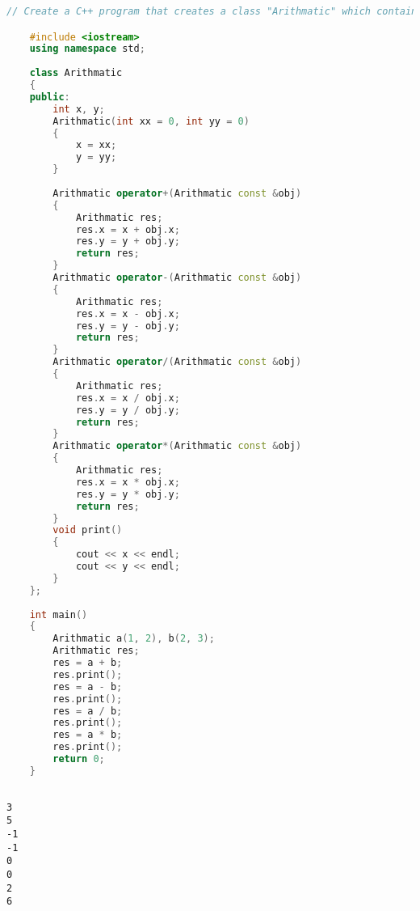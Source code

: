 \documentclass[11pt]{article}
\begin{document}
\begin{lstlisting}[language=C++]
	// Create a C++ program that creates a class "Arithmatic" which contains integer data members. Overload all the four arthmetic operators so that they operate on the objects of "Arthmatic".

	#include <iostream>
	using namespace std;
	
	class Arithmatic
	{
	public:
		int x, y;
		Arithmatic(int xx = 0, int yy = 0)
		{
			x = xx;
			y = yy;
		}
	
		Arithmatic operator+(Arithmatic const &obj)
		{
			Arithmatic res;
			res.x = x + obj.x;
			res.y = y + obj.y;
			return res;
		}
		Arithmatic operator-(Arithmatic const &obj)
		{
			Arithmatic res;
			res.x = x - obj.x;
			res.y = y - obj.y;
			return res;
		}
		Arithmatic operator/(Arithmatic const &obj)
		{
			Arithmatic res;
			res.x = x / obj.x;
			res.y = y / obj.y;
			return res;
		}
		Arithmatic operator*(Arithmatic const &obj)
		{
			Arithmatic res;
			res.x = x * obj.x;
			res.y = y * obj.y;
			return res;
		}
		void print()
		{
			cout << x << endl;
			cout << y << endl;
		}
	};
	
	int main()
	{
		Arithmatic a(1, 2), b(2, 3);
		Arithmatic res;
		res = a + b;
		res.print();
		res = a - b;
		res.print();
		res = a / b;
		res.print();
		res = a * b;
		res.print();
		return 0;
	}
	
\end{lstlisting}
\begin{verbatim}
3
5
-1
-1
0
0
2
6
\end{verbatim}
\end{document}
